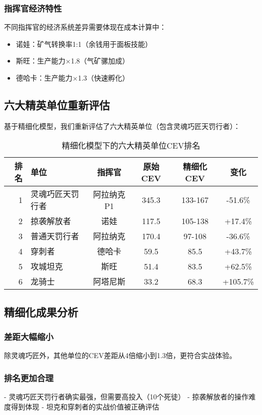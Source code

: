 \documentclass[a4paper,12pt]{article}
\begin{document}
\subsubsection{指挥官经济特性}
不同指挥官的经济系统差异需要体现在成本计算中：
\begin{itemize}
\item 诺娃：矿气转换率1:1（余钱用于面板技能）
\item 斯旺：生产能力×1.8（气矿骡加成）
\item 德哈卡：生产能力×1.3（快速孵化）
\end{itemize}

\subsection{六大精英单位重新评估}

基于精细化模型，我们重新评估了六大精英单位（包含灵魂巧匠天罚行者）：

\begin{table}[h]
\centering
\caption{精细化模型下的六大精英单位CEV排名}
\begin{tabular}{rlcccc}
\toprule
\textbf{排名} & \textbf{单位} & \textbf{指挥官} & \textbf{原始CEV} & \textbf{精细化CEV} & \textbf{变化} \\
\midrule
1 & 灵魂巧匠天罚行者 & 阿拉纳克P1 & 345.3 & 133-167 & -51.6\% \\
2 & 掠袭解放者 & 诺娃 & 117.5 & 105-138 & +17.4\% \\
3 & 普通天罚行者 & 阿拉纳克 & 170.4 & 97-108 & -36.6\% \\
4 & 穿刺者 & 德哈卡 & 59.5 & 85.5 & +43.7\% \\
5 & 攻城坦克 & 斯旺 & 51.4 & 83.5 & +62.5\% \\
6 & 龙骑士 & 阿塔尼斯 & 33.2 & 68.3 & +105.7\% \\
\bottomrule
\end{tabular}
\end{table}

\subsection{精细化成果分析}

\subsubsection{差距大幅缩小}
除灵魂巧匠外，其他单位的CEV差距从4倍缩小到1.3倍，更符合实战体验。

\subsubsection{排名更加合理}
- 灵魂巧匠天罚行者确实最强，但需要高投入（10个死徒）
- 掠袭解放者的操作难度得到体现
- 坦克和穿刺者的实战价值被正确评估
\end{document}
